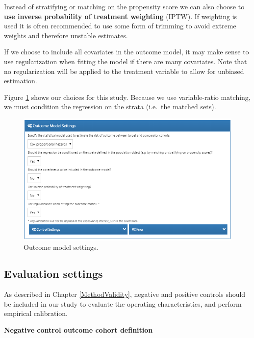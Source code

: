 \documentclass[11pt]{book}
\theoremstyle{definition}
\theoremstyle{definition}
\theoremstyle{definition}
\theoremstyle{remark}
\begin{document}
Instead of stratifying or matching on the propensity score we can also choose to \textbf{use inverse probability of treatment weighting} (IPTW). If weighting is used it is often recommended to use some form of trimming to avoid extreme weights and therefore unstable estimates.

If we choose to include all covariates in the outcome model, it may make sense to use regularization when fitting the model if there are many covariates. Note that no regularization will be applied to the treatment variable to allow for unbiased estimation.

Figure \ref{fig:outcomeModelSettings} shows our choices for this study. Because we use variable-ratio matching, we must condition the regression on the strata (i.e.~the matched sets).

\begin{figure}

{\centering \includegraphics[width=1\linewidth]{images/PopulationLevelEstimation/outcomeModelSettings} 

}

\caption{Outcome model settings.}\label{fig:outcomeModelSettings}
\end{figure}

\hypertarget{evaluationSettings}{%
\subsection{Evaluation settings}\label{evaluationSettings}}

As described in Chapter \ref{MethodValidity}, negative and positive controls should be included in our study to evaluate the operating characteristics, and perform empirical calibration.

\textbf{Negative control outcome cohort definition}
\end{document}
